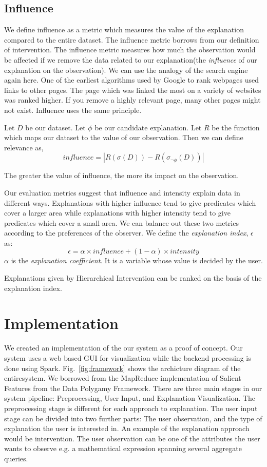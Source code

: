 \subsection{Influence}
\label{sec:influence}
We define influence as a metric which measures the value of the explanation compared to the entire dataset. The influence metric borrows from our definition of intervention. The influence metric measures how much the observation would be affected if we remove the data related to our explanation(the \textit{influence} of our explanation on the observation). We can use the analogy of the search engine again here. One of the earliest algorithms used by Google to rank webpages used links to other pages\citep{brin1998anatomy}. The page which was linked the most on a variety of websites was ranked higher. If you remove a highly relevant page, many other pages might not exist. Influence uses the same principle.

Let $D$ be our dataset. Let $\phi$ be our candidate explanation. Let $R$ be the function which maps our dataset to the value of our observation. Then we can define relevance as,
$$influence = |R(\sigma(D)) - R(\sigma_{\neg \phi} (D)) |$$

The greater the value of influence, the more its impact on the observation.

Our evaluation metrics suggest that influence and intensity explain data in different ways. Explanations with higher influence tend to give predicates which cover a larger area while explanations with higher intensity tend to give predicates which cover a small area. We can balance out these two metrics according to the preferences of the observer. We define the \textit{explanation index}, $\epsilon$ as:
$$\epsilon = \alpha \times influence + (1-\alpha) \times intensity$$
$\alpha$ is the \textit{explanation coefficient}. It is a variable whose value is decided by the user.

Explanations given by Hierarchical Intervention can be ranked on the basis of the explanation index.


\section{Implementation}
\label{sec:implementation}
We created an implementation of the our system as a proof of concept. Our system uses a web based GUI for visualization while the backend processing is done using Spark\citep{shanahan2015large}. Fig.~\ref{fig:framework} shows the archicture diagram of the entiresystem. We borrowed from the MapReduce implementation of Salient Features from the Data Polygamy Framework\citep{chirigati2016data}. There are three main stages in our system pipeline: Preprocessing, User Input, and Explanation Visualization. The preprocessing stage is different for each approach to explanation. The user input stage can be divided into two further parts: The user observation, and the type of explanation the user is interested in. An example of the explanation approach would be intervention. The user observation can be one of the attributes the user wants to observe e.g. a mathematical expression spanning several aggregate queries.


